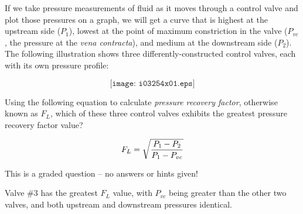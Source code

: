 

If we take pressure measurements of fluid as it moves through a control valve and plot those pressures on a graph, we will get a curve that is highest at the upstream side ($P_1$), lowest at the point of maximum constriction in the valve ($P_{vc}$, the pressure at the {\it vena contracta}), and medium at the downstream side ($P_2$).  The following illustration shows three differently-constructed control valves, each with its own pressure profile:

$$\texttt{[image: i03254x01.eps]}$$

Using the following equation to calculate {\it pressure recovery factor}, otherwise known as $F_L$, which of these three control valves exhibits the greatest pressure recovery factor value?

$$F_L = \sqrt{{P_1 - P_2} \over {P_1 - P_{vc}}}$$

\vfil 

\eject






This is a graded question -- no answers or hints given!
 






Valve \#3 has the greatest $F_L$ value, with $P_{vc}$ being greater than the other two valves, and both upstream and downstream pressures identical.





